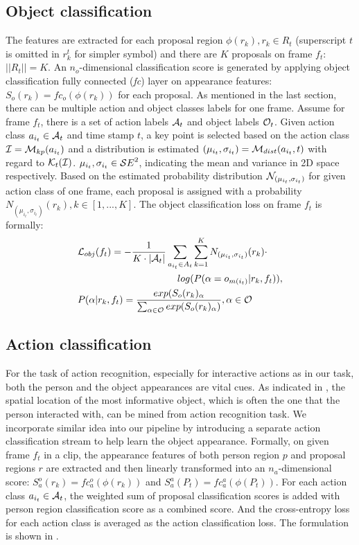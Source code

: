 \subsection{Object classification}
The features are extracted for each proposal region $\phi(r_k), r_k \in R_t$ (superscript $t$ is omitted in $r_k^t$ for simpler symbol) and there are $K$ proposals on frame $f_t$: $||R_t||=K$. An $n_o$-dimensional classification score is generated by applying object classification fully connected (\textit{fc}) layer on appearance features: $S_o(r_k) = fc_o(\phi(r_k))$ for each proposal. As mentioned in the last section, there can be multiple action and object classes labels for one frame. Assume for frame $f_t$, there is a set of action labels ${\mathcal A}_t$ and object labels ${\mathcal O}_t$. Given action class $a_{i_t} \in {\mathcal A_t}$ and time stamp $t$, a key point is selected based on the action class ${\mathcal I} = {\mathcal M}_{kp}(a_{i_t})$ and a distribution is estimated $(\mu_{i_t}, \sigma_{i_t}) = {\mathcal M}_{dist}(a_{i_t}, t)$ with regard to ${\mathcal K}_t({\mathcal I})$. $\mu_{i_t}, \sigma_{i_t} \in {\mathcal SE}^2$, indicating the mean and variance in 2D space respectively. Based on the estimated probability distribution ${\mathcal N}_{(\mu_{i_t}, \sigma_{i_t})}$ for given action class of one frame, each proposal is assigned with a probability $N_{(\mu_{i_t}, \sigma_{i_t})}(r_k), k\in [1,...,K]$. The object classification loss on frame $f_t$ is formally:
\begin{align}
\label{eqn:obj_cls_loss}
&{\mathcal L}_{obj} (f_t) = -\frac{1}{K\cdot |{\mathcal A}_t|}\sum_{a_{i_t}\in {A_t}}\sum_{k=1}^{K} N_{(\mu_{i_t}, \sigma_{i_t})}(r_k) \cdot \nonumber \\
&~~~~~~~~~~~~~~~~~~~~~~~~~~~~~~~log(P(\alpha=o_{m(i_t)}|r_k, f_t)), \nonumber\\
&P(\alpha|r_k, f_t) = \frac{exp(S_o(r_k)_{\alpha}}{\sum_{\alpha \in {\mathcal O}}exp(S_o(r_k)_\alpha)}, \alpha \in {\mathcal O}
\end{align}

\subsection{Action classification}
For the task of action recognition, especially for interactive actions as in our task, both the person and the object appearances are vital cues. As indicated in \cite{gkioxari2015contextual}, the spatial location of the most informative object, which is often the one that the person interacted with, can be mined from action recognition task. We incorporate similar idea into our pipeline by introducing a separate action classification stream to help learn the object appearance. Formally, on given frame $f_t$ in a clip, the appearance features of both person region $p$ and proposal regions $r$ are extracted and then linearly transformed into an $n_a$-dimensional score: $S_a^o(r_k) = fc_a^o(\phi(r_k))$ and $S_a^a(P_t) = fc_a^a(\phi(P_t))$. For each action class $a_{i_t} \in {\mathcal A}_t$, the weighted sum of proposal classification scores is added with person region classification score as a combined score. And the cross-entropy loss for each action class is averaged as the action classification loss. The formulation is shown in .


